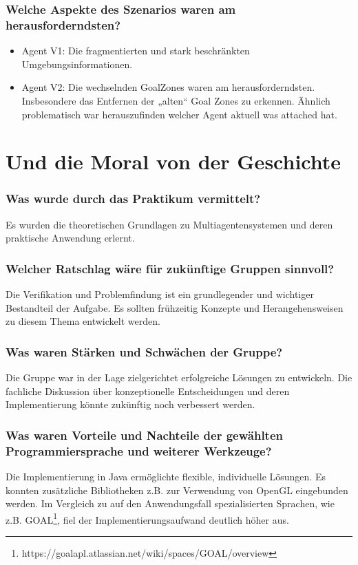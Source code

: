 \documentclass[runningheads]{llncs}
\begin{document}
	\subsubsection{Welche Aspekte des Szenarios waren am herausforderndsten?}
	\begin{itemize}
		\item Agent V1: Die fragmentierten und stark beschränkten Umgebungsinformationen. 
		\item Agent V2: Die wechselnden GoalZones waren am herausforderndsten. Insbesondere das Entfernen der „alten“ Goal Zones zu erkennen. Ähnlich problematisch war herauszufinden welcher Agent aktuell was attached hat.
	\end{itemize}
	
	\section{Und die Moral von der Geschichte}
	\subsubsection{Was wurde durch das Praktikum vermittelt?\\}
	Es wurden die theoretischen Grundlagen zu Multiagentensystemen und deren praktische Anwendung erlernt.
	\subsubsection{Welcher Ratschlag wäre für zukünftige Gruppen sinnvoll?\\}
	Die Verifikation und Problemfindung ist ein grundlegender und wichtiger Bestandteil der Aufgabe. Es sollten frühzeitig Konzepte und Herangehensweisen zu diesem Thema entwickelt werden.
	
	\subsubsection{Was waren Stärken und Schwächen der Gruppe?\\}
	Die Gruppe war in der Lage zielgerichtet erfolgreiche Lösungen zu entwickeln. Die fachliche Diskussion über konzeptionelle Entscheidungen und deren Implementierung könnte zukünftig noch verbessert werden.   
	
	\subsubsection{Was waren Vorteile und Nachteile der gewählten Programmiersprache und weiterer Werkzeuge?\\}
	Die Implementierung in Java ermöglichte flexible, individuelle Lösungen. Es konnten zusätzliche Bibliotheken z.B. zur Verwendung von OpenGL eingebunden werden. Im Vergleich zu auf den Anwendungsfall spezialisierten Sprachen, wie z.B. GOAL\footnote{https://goalapl.atlassian.net/wiki/spaces/GOAL/overview}, fiel der Implementierungsaufwand deutlich höher aus.
	
\end{document}
